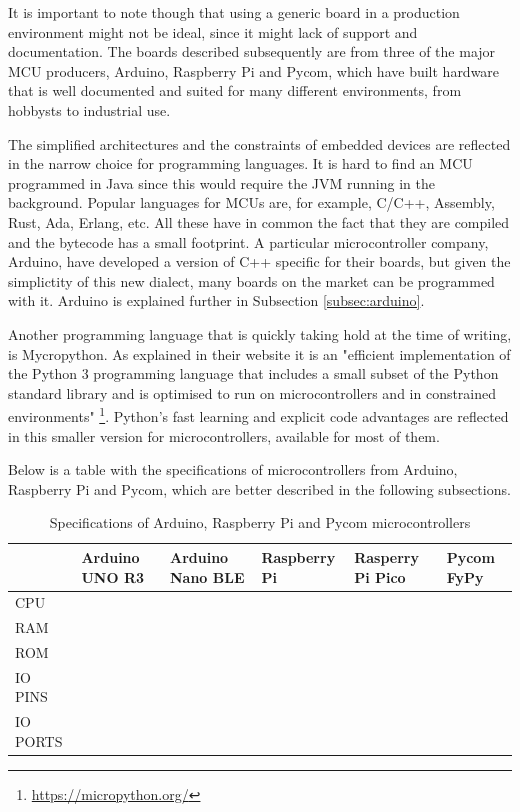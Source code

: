 	It is important to note though that using a generic board in a production environment might not be ideal, since it might lack of support and documentation.
	The boards described subsequently are from three of the major MCU producers, Arduino, Raspberry Pi and Pycom, which have built hardware that is well documented and suited for many different environments, from hobbysts to industrial use.
	
	The simplified architectures and the constraints of embedded devices are reflected in the narrow choice for programming languages.
	It is hard to find an MCU programmed in Java since this would require the JVM running in the background.
	Popular languages for MCUs are, for example, C/C++, Assembly, Rust, Ada, Erlang, etc.
	All these have in common the fact that they are compiled and the bytecode has a small footprint.
	A particular microcontroller company, Arduino, have developed a version of C++ specific for their boards, but given the simplictity of this new dialect, many boards on the market can be programmed with it.
	Arduino is explained further in Subsection \ref{subsec:arduino}.

	Another programming language that is quickly taking hold at the time of writing, is Mycropython.
	As explained in their website it is an "efficient implementation of the Python 3 programming language that includes a small subset of the Python standard library and is optimised to run on microcontrollers and in constrained environments" \footnote{\url{https://micropython.org/}}.
	Python's fast learning and explicit code advantages are reflected in this smaller version for microcontrollers, available for most of them.
	
	
	\newpage
	
	Below is a table with the specifications of microcontrollers from Arduino, Raspberry Pi and Pycom, which are better described in the following subsections.
	\begin{table}[htbp]
		\begin{center}
			\begin{tabularx}{\textwidth}{@{}|Y|Y|Y|Y|Y|Y|@{}} 
				\hline
				& Arduino UNO R3 & Arduino Nano BLE & Raspberry Pi & Rasperry Pi Pico & Pycom FyPy \\\hline
					CPU &&&&& \\\hline
					RAM &&&&& \\\hline
					ROM &&&&& \\\hline
					IO PINS &&&&& \\\hline
					IO PORTS &&&&& \\\hline
			\end{tabularx}
			\caption{Specifications of Arduino, Raspberry Pi and Pycom microcontrollers}
			\label{table:1}
		\end{center}
	\end{table}

